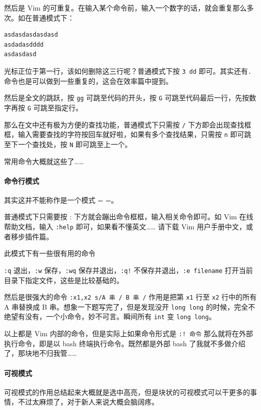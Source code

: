 然后是 Vim 的可重复。在输入某个命令前，输入一个数字的话，就会重复那么多次。如在普通模式下：

\begin{verbatim}
asdasdasdasdasd
asdadasdddd
asdasdasd
\end{verbatim}

光标正位于第一行，该如何删除这三行呢？普通模式下按  \texttt{3 dd}  即可。其实还有\texttt{.}命令也是可以做到一些重复的，这会在效率篇中提到。

然后是全文的跳跃，按 \texttt{gg} 可跳至代码的开头，按 \texttt{G} 可跳至代码最后一行，先按数字再按 \texttt{G} 可跳至指定行。

那么在文中还有极为方便的查找功能，普通模式下只需按 \texttt{/} 下方即会出现查找框框，输入需要查找的字符按回车就好啦，如果有多个查找结果，只需按 \texttt{n} 即可跳至下一个查找处，按 \texttt{N} 即可跳至上一个。

常用命令大概就这些了……

\paragraph{命令行模式}

其实这并不能称作是一个模式 = =。

普通模式下只需要按 : 下方就会蹦出命令框框，输入相关命令即可。如 Vim 在线帮助文档，输入 \texttt{:help} 即可，如果看不懂英文…… 请下载 Vim 用户手册中文，或者移步插件篇。

此模式下有一些很有用的命令

\texttt{:q} 退出，\texttt{:w} 保存，\texttt{:wq} 保存并退出，\texttt{:q!} 不保存并退出，\texttt{:e filename} 打开当前目录下指定文件，这些是比较基础的。

然后是很强大的命令 \texttt{:x1,x2 s/A 串 / B 串 /} 作用是把第 \texttt{x1} 行至 \texttt{x2} 行中的所有 A 串替换成 B 串。想象一下题写完了，但是发现没开 \texttt{long long} 的时候，完全不绝望有没有，一个小命令，妙不可言。瞬间所有 \texttt{int} 变 \texttt{long long}。

以上都是 Vim 内部的命令，但是实际上如果命令形式是 \texttt{:! 命令} 那么就将在外部执行命令，即是以 bash 终端执行命令。既然都是外部 bash 了我就不多做介绍了，那块地不归我管……

\paragraph{可视模式}

可视模式的作用总结起来大概就是选中高亮，但是块状的可视模式可以干更多的事情，不过太麻烦了，对于新人来说大概会脑阔疼。

